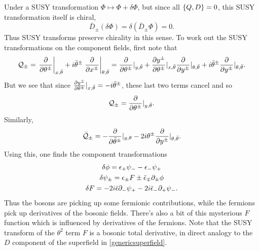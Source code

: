 Under a SUSY transformation $\Phi\mapsto \Phi +\delta \Phi$, but since all $\set{Q,D}=0$, this SUSY transformation itself is chiral,
\begin{equation}
    \bar D_\pm(\delta \Phi)= \delta(\bar D_\pm \Phi)=0.
\end{equation}
Thus SUSY transforms preserve chirality in this sense. To work out the SUSY transformations on the component fields, first note that
\begin{equation}
    \cQ_\pm = \left.\P{}{\theta^\pm}\right|_{x,\bar\theta}+i\bar \theta^\pm \left.\P{}{x^\pm}\right|_{\theta,\bar \theta} =\P{}{\theta^\pm}|_{y,\bar\theta} +\P{y^\pm}{\theta^\pm}|_{x,\bar \theta} \P{}{y^\pm} |_{\theta,\bar \theta}+i\bar \theta^\pm \P{}{y^\pm}|_{\theta,\bar\theta}.
\end{equation}
But we see that since $\P{y^\pm}{\theta^\pm}|_{x,\bar \theta}=-i\bar \theta^\pm$, these last two terms cancel and so
\begin{equation}
    \cQ_\pm =\P{}{\theta^\pm}|_{y,\bar\theta}.
\end{equation}
Similarly,
\begin{equation}
    \bar \cQ_\pm = -\P{}{\bar \theta^\pm}|_{y,\theta} -2i \theta^\pm \P{}{y^\pm}|_{\theta,\bar\theta}.
\end{equation}
Using this, one finds the component transformations
\begin{gather}
    \delta \phi = \epsilon_+ \psi_- - \epsilon_- \psi_+\\
    \delta \psi_\pm = \epsilon_\pm F \pm \bar \epsilon_\mp \p_\pm \phi\\
    \delta F = -2i\bar \epsilon \p_- \psi_+ - 2i \bar \epsilon_- \p_+ \psi_-.
\end{gather}
Thus the bosons are picking up some fermionic contributions, while the fermions pick up derivatives of the bosonic fields. There's also a bit of this mysterious $F$ function which is influenced by derivatives of the fermions. Note that the SUSY transform of the $\theta^2$ term $F$ is a bosonic total derivative, in direct analogy to the $D$ component of the superfield in \ref{genericsuperfield}.


